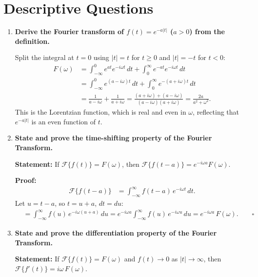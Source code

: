 \documentclass[12pt,a4paper]{article}
\begin{document}
\section{Descriptive Questions}

\begin{enumerate}[label=\textbf{Q\arabic*.}, leftmargin=2.5em]

\item \textbf{Derive the Fourier transform of $f(t) = e^{-a|t|}$ ($a > 0$) from the definition.}

Split the integral at $t = 0$ using $|t| = t$ for $t \geq 0$ and $|t| = -t$ for $t < 0$:
\begin{align*}
F(\omega) &= \int_{-\infty}^{0} e^{at} e^{-i\omega t}\,dt + \int_{0}^{\infty} e^{-at} e^{-i\omega t}\,dt \\
          &= \int_{-\infty}^{0} e^{(a-i\omega)t}\,dt + \int_{0}^{\infty} e^{-(a+i\omega)t}\,dt \\
          &= \frac{1}{a - i\omega} + \frac{1}{a + i\omega}
           = \frac{(a+i\omega)+(a-i\omega)}{(a-i\omega)(a+i\omega)}
           = \frac{2a}{a^2+\omega^2}.
\end{align*}
This is the Lorentzian function, which is real and even in $\omega$, reflecting that $e^{-a|t|}$ is an even function of $t$.

\item \textbf{State and prove the time-shifting property of the Fourier Transform.}

\textbf{Statement:} If $\mathcal{F}\{f(t)\} = F(\omega)$, then $\mathcal{F}\{f(t-a)\} = e^{-i\omega a} F(\omega)$.

\textbf{Proof:}
\begin{align*}
\mathcal{F}\{f(t-a)\}
  &= \int_{-\infty}^{\infty} f(t-a)\,e^{-i\omega t}\,dt.
\end{align*}
Let $u = t - a$, so $t = u + a$, $dt = du$:
\begin{align*}
  &= \int_{-\infty}^{\infty} f(u)\,e^{-i\omega(u+a)}\,du
   = e^{-i\omega a}\int_{-\infty}^{\infty} f(u)\,e^{-i\omega u}\,du
   = e^{-i\omega a}\,F(\omega). \qquad \square
\end{align*}

\item \textbf{State and prove the differentiation property of the Fourier Transform.}

\textbf{Statement:} If $\mathcal{F}\{f(t)\} = F(\omega)$ and $f(t) \to 0$ as $|t| \to \infty$, then
$\mathcal{F}\{f'(t)\} = i\omega\,F(\omega)$.


\end{enumerate}
\end{document}
